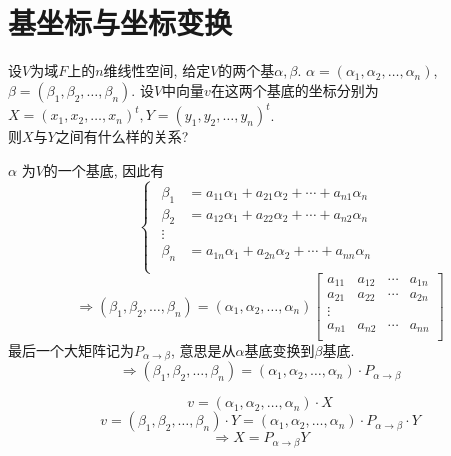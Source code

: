 \documentclass{book}
\begin{document}
\section{基坐标与坐标变换}
\begin{question}
设$V$为域$F$上的$n$维线性空间, 给定$V$的两个基$\alpha, \beta$.
$\alpha = (\alpha_1, \alpha_2, \ldots, \alpha_n)$,
$\beta = (\beta_1, \beta_2, \ldots, \beta_n)$.
设$V$中向量$v$在这两个基底的坐标分别为$X = (x_1, x_2, \ldots, x_n)^t, Y = (y_1, y_2, \ldots, y_n)^t$. \\
则$X$与$Y$之间有什么样的关系?
\end{question}
\begin{answer}
$\alpha$ 为$V$的一个基底, 因此有
$$
\begin{cases}
\begin{aligned}
\beta_1 & = a_{11} \alpha_1 + a_{21} \alpha_2 + \cdots + a_{n1} \alpha_n \\
\beta_2 & = a_{12} \alpha_1 + a_{22} \alpha_2 + \cdots + a_{n2} \alpha_n \\
		\vdots \\
\beta_n & = a_{1n} \alpha_1 + a_{2n} \alpha_2 + \cdots + a_{nn} \alpha_n \\
\end{aligned}
\end{cases}
$$
$$
\Rightarrow
(\beta_1, \beta_2, \ldots, \beta_n) = (\alpha_1, \alpha_2, \ldots, \alpha_n)
\begin{bmatrix}
a_{11} & a_{12}  & \cdots & a_{1n} \\
a_{21} & a_{22}  & \cdots & a_{2n} \\
	\vdots \\
a_{n1} & a_{n2}  & \cdots & a_{nn} \\
\end{bmatrix}
$$
最后一个大矩阵记为$P_{\alpha \rightarrow \beta}$, 意思是从$\alpha$基底变换到$\beta$基底.
$$\Rightarrow (\beta_1, \beta_2, \ldots, \beta_n) = (\alpha_1, \alpha_2, \ldots, \alpha_n) \cdot P_{\alpha \rightarrow \beta} $$

$$v = (\alpha_1, \alpha_2, \ldots, \alpha_n) \cdot X$$
$$v = (\beta_1, \beta_2, \ldots, \beta_n) \cdot Y = (\alpha_1, \alpha_2, \ldots, \alpha_n) \cdot P_{\alpha \rightarrow \beta} \cdot Y $$
$$\Rightarrow X = P_{\alpha \rightarrow \beta} Y$$
\end{answer}
\end{document}

